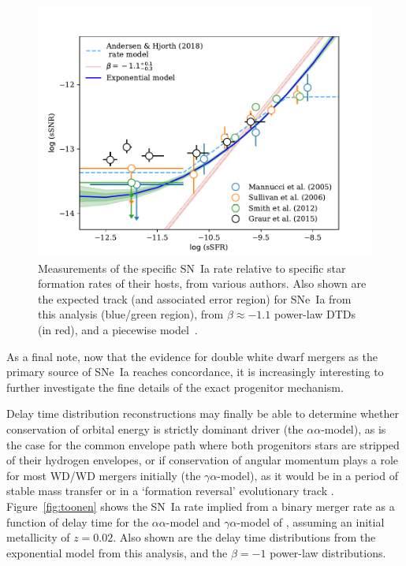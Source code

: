 \documentclass[apj]{aastex62}
\begin{document}
\begin{figure}[t]
   \centering
   \includegraphics[width=6.1in]{figure_ssfr.pdf}
   \caption{\footnotesize Measurements of the specific SN~Ia rate relative to specific star formation rates of their hosts, from various authors. Also shown are the expected track (and associated error region) for SNe~Ia from this analysis (blue/green region), from $\beta\approx-1.1$ power-law DTDs (in red), and a piecewise model~\cite[][ blue-dashed line]{Andersen:2018dp}.}
   \label{fig:ssfr}
\end{figure}

As a final note, now that the evidence for double white dwarf mergers as the primary source of SNe~Ia reaches concordance, it is increasingly interesting to further investigate the fine details of the exact progenitor mechanism. 

Delay time distribution reconstructions may finally be able to determine whether conservation of orbital energy is strictly dominant driver (the $\alpha\alpha$-model), as is the case for the common envelope path where both progenitors stars are stripped of their hydrogen envelopes, or if conservation of angular momentum plays a role for most WD/WD mergers initially (the $\gamma\alpha$-model), as it would be in a period of stable mass transfer or in a `formation reversal' evolutionary track \citep{Toonen:2013le}. Figure~\ref{fig:toonen} shows the SN~Ia rate implied from a binary merger rate as a function of delay time for the $\alpha\alpha$-model and $\gamma\alpha$-model of \cite{Toonen:2013ng}, assuming an initial metallicity of $z=0.02$. Also shown are the delay time distributions from the exponential model from this analysis, and the $\beta=-1$ power-law distributions. 
\end{document}
